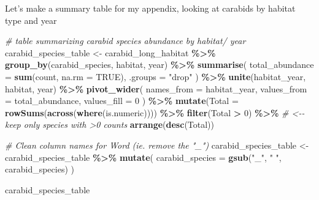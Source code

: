 \documentclass[
]{article}
\newenvironment{Shaded}{\begin{snugshade}}{\end{snugshade}}
\newcommand{\AttributeTok}[1]{\textcolor[rgb]{0.13,0.29,0.53}{#1}}
\newcommand{\CommentTok}[1]{\textcolor[rgb]{0.56,0.35,0.01}{\textit{#1}}}
\newcommand{\ConstantTok}[1]{\textcolor[rgb]{0.56,0.35,0.01}{#1}}
\newcommand{\DecValTok}[1]{\textcolor[rgb]{0.00,0.00,0.81}{#1}}
\newcommand{\FunctionTok}[1]{\textcolor[rgb]{0.13,0.29,0.53}{\textbf{#1}}}
\newcommand{\NormalTok}[1]{#1}
\newcommand{\OtherTok}[1]{\textcolor[rgb]{0.56,0.35,0.01}{#1}}
\newcommand{\SpecialCharTok}[1]{\textcolor[rgb]{0.81,0.36,0.00}{\textbf{#1}}}
\newcommand{\StringTok}[1]{\textcolor[rgb]{0.31,0.60,0.02}{#1}}
\begin{document}
Let's make a summary table for my appendix, looking at carabids by
habitat type and year

\begin{Shaded}
\begin{Highlighting}[]
\CommentTok{\# table summarizing carabid species abundance by habitat/ year}
\NormalTok{carabid\_species\_table }\OtherTok{\textless{}{-}}\NormalTok{ carabid\_long\_habitat }\SpecialCharTok{\%\textgreater{}\%}
  \FunctionTok{group\_by}\NormalTok{(carabid\_species, habitat, year) }\SpecialCharTok{\%\textgreater{}\%}
  \FunctionTok{summarise}\NormalTok{(}
    \AttributeTok{total\_abundance =} \FunctionTok{sum}\NormalTok{(count, }\AttributeTok{na.rm =} \ConstantTok{TRUE}\NormalTok{),}
    \AttributeTok{.groups =} \StringTok{"drop"}
\NormalTok{  ) }\SpecialCharTok{\%\textgreater{}\%}
  \FunctionTok{unite}\NormalTok{(habitat\_year, habitat, year) }\SpecialCharTok{\%\textgreater{}\%}
  \FunctionTok{pivot\_wider}\NormalTok{(}
    \AttributeTok{names\_from  =}\NormalTok{ habitat\_year,}
    \AttributeTok{values\_from =}\NormalTok{ total\_abundance,}
    \AttributeTok{values\_fill =} \DecValTok{0}
\NormalTok{  ) }\SpecialCharTok{\%\textgreater{}\%}
  \FunctionTok{mutate}\NormalTok{(}\AttributeTok{Total =} \FunctionTok{rowSums}\NormalTok{(}\FunctionTok{across}\NormalTok{(}\FunctionTok{where}\NormalTok{(is.numeric)))) }\SpecialCharTok{\%\textgreater{}\%}
  \FunctionTok{filter}\NormalTok{(Total }\SpecialCharTok{\textgreater{}} \DecValTok{0}\NormalTok{) }\SpecialCharTok{\%\textgreater{}\%}     \CommentTok{\# \textless{}{-}{-} keep only species with \textgreater{}0 counts}
  \FunctionTok{arrange}\NormalTok{(}\FunctionTok{desc}\NormalTok{(Total))}

\CommentTok{\# Clean column names for Word (ie. remove the "\_")}
\NormalTok{carabid\_species\_table }\OtherTok{\textless{}{-}}\NormalTok{ carabid\_species\_table }\SpecialCharTok{\%\textgreater{}\%}
  \FunctionTok{mutate}\NormalTok{(}
    \AttributeTok{carabid\_species =} \FunctionTok{gsub}\NormalTok{(}\StringTok{"\_"}\NormalTok{, }\StringTok{" "}\NormalTok{, carabid\_species)}
\NormalTok{  )}


\NormalTok{carabid\_species\_table}
\end{Highlighting}
\end{Shaded}
\end{document}
